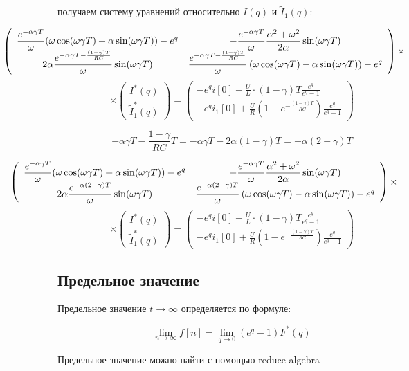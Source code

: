 \documentclass[a4paper,12pt]{article}
\begin{document}
получаем систему уравнений относительно $I(q)$ и $\tilde{I}_1(q)$:

$$
\hspace{-2cm}
\left(
\begin{array}{cc}
{\displaystyle \frac{e^{-\alpha\gamma T}}{\omega}(\omega\cos(\omega\gamma T) + \alpha\sin(\omega\gamma T)) - e^q} 
&
{\displaystyle -\frac{e^{-\alpha\gamma T}}{\omega}\frac{\alpha^2+\omega^2}{2\alpha}\sin(\omega\gamma T)}\\
	{\displaystyle 2\alpha\frac{e^{-\alpha\gamma T - \frac{(1-\gamma)T}{RC}}}{\omega}\sin(\omega\gamma T)}
&
	{\displaystyle \frac{e^{-\alpha\gamma T - \frac{(1-\gamma)T}{RC}}}{\omega}
	\left( \omega\cos(\omega\gamma T) - \alpha \sin(\omega\gamma T)\right)} - e^q
\end{array}
\right)\times
$$
$$
\times\left(
\begin{array}{c}
I^*(q)\\
\tilde{I}_1^*(q)
\end{array}
\right)=
\left(
\begin{array}{c}
	{\displaystyle - e^qi[0] - \frac{U}{L}\cdot(1-\gamma)T
	\frac{e^q}{e^q - 1}} \\[2.2mm]
{\displaystyle - e^q i_1[0] +
	\frac{U}{R}\left(1- e^{-\frac{(1-\gamma)T}{RC}} \right) \frac{e^q}{e^q-1}}
\end{array}
\right)
$$

$$
-\alpha\gamma T - \frac{1-\gamma}{RC}T = -\alpha\gamma T - 2\alpha(1-\gamma)T = - \alpha(2-\gamma)T
$$

$$
\hspace{-2cm}
\left(
\begin{array}{cc}
{\displaystyle \frac{e^{-\alpha\gamma T}}{\omega}(\omega\cos(\omega\gamma T) + \alpha\sin(\omega\gamma T)) - e^q}
&
{\displaystyle -\frac{e^{-\alpha\gamma T}}{\omega}\frac{\alpha^2+\omega^2}{2\alpha}\sin(\omega\gamma T)}\\
	{\displaystyle 2\alpha\frac{e^{-\alpha(2-\gamma)T}}{\omega}\sin(\omega\gamma T)}
&
        {\displaystyle \frac{e^{-\alpha(2-\gamma)T}}{\omega}
        \left( \omega\cos(\omega\gamma T) - \alpha \sin(\omega\gamma T)\right)} - e^q
\end{array}
\right)\times
$$
$$
\times\left(
\begin{array}{c}
I^*(q)\\
\tilde{I}_1^*(q)
\end{array}
\right)=
\left(
\begin{array}{c}
        {\displaystyle - e^qi[0] - \frac{U}{L}\cdot(1-\gamma)T
        \frac{e^q}{e^q - 1}} \\[2.2mm]
{\displaystyle - e^q i_1[0] +
        \frac{U}{R}\left(1- e^{-\frac{(1-\gamma)T}{RC}} \right) \frac{e^q}{e^q-1}}
\end{array}
\right)
$$

\subsection{Предельное значение}

Предельное значение $t\rightarrow \infty$ определяется по формуле:

$$
\lim_{n\rightarrow \infty} f[n] =\lim_{q\rightarrow 0} (e^q -1) F^*(q)
$$


Предельное значение можно найти с помощью reduce-algebra

\end{document}
